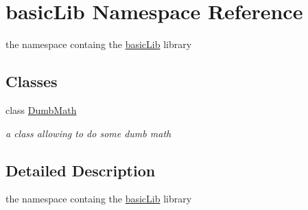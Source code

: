 \hypertarget{namespacebasic_lib}{}\section{basic\+Lib Namespace Reference}
\label{namespacebasic_lib}


the namespace containg the \hyperlink{namespacebasic_lib}{basic\+Lib} library  


\subsection*{Classes}
\begin{DoxyCompactItemize}
\item 
class \hyperlink{classbasic_lib_1_1_dumb_math}{Dumb\+Math}
\begin{DoxyCompactList}\small\item\em a class allowing to do some dumb math \end{DoxyCompactList}\end{DoxyCompactItemize}


\subsection{Detailed Description}
the namespace containg the \hyperlink{namespacebasic_lib}{basic\+Lib} library 